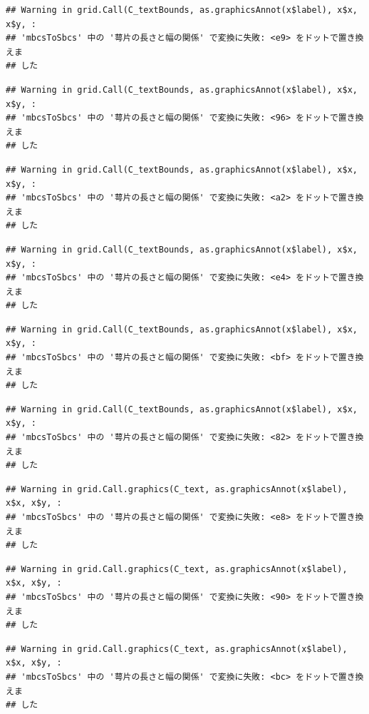 \documentclass[
]{book}
\begin{document}
\begin{verbatim}
## Warning in grid.Call(C_textBounds, as.graphicsAnnot(x$label), x$x, x$y, :
## 'mbcsToSbcs' 中の '萼片の長さと幅の関係' で変換に失敗: <e9> をドットで置き換えま
## した
\end{verbatim}

\begin{verbatim}
## Warning in grid.Call(C_textBounds, as.graphicsAnnot(x$label), x$x, x$y, :
## 'mbcsToSbcs' 中の '萼片の長さと幅の関係' で変換に失敗: <96> をドットで置き換えま
## した
\end{verbatim}

\begin{verbatim}
## Warning in grid.Call(C_textBounds, as.graphicsAnnot(x$label), x$x, x$y, :
## 'mbcsToSbcs' 中の '萼片の長さと幅の関係' で変換に失敗: <a2> をドットで置き換えま
## した
\end{verbatim}

\begin{verbatim}
## Warning in grid.Call(C_textBounds, as.graphicsAnnot(x$label), x$x, x$y, :
## 'mbcsToSbcs' 中の '萼片の長さと幅の関係' で変換に失敗: <e4> をドットで置き換えま
## した
\end{verbatim}

\begin{verbatim}
## Warning in grid.Call(C_textBounds, as.graphicsAnnot(x$label), x$x, x$y, :
## 'mbcsToSbcs' 中の '萼片の長さと幅の関係' で変換に失敗: <bf> をドットで置き換えま
## した
\end{verbatim}

\begin{verbatim}
## Warning in grid.Call(C_textBounds, as.graphicsAnnot(x$label), x$x, x$y, :
## 'mbcsToSbcs' 中の '萼片の長さと幅の関係' で変換に失敗: <82> をドットで置き換えま
## した
\end{verbatim}

\begin{verbatim}
## Warning in grid.Call.graphics(C_text, as.graphicsAnnot(x$label), x$x, x$y, :
## 'mbcsToSbcs' 中の '萼片の長さと幅の関係' で変換に失敗: <e8> をドットで置き換えま
## した
\end{verbatim}

\begin{verbatim}
## Warning in grid.Call.graphics(C_text, as.graphicsAnnot(x$label), x$x, x$y, :
## 'mbcsToSbcs' 中の '萼片の長さと幅の関係' で変換に失敗: <90> をドットで置き換えま
## した
\end{verbatim}

\begin{verbatim}
## Warning in grid.Call.graphics(C_text, as.graphicsAnnot(x$label), x$x, x$y, :
## 'mbcsToSbcs' 中の '萼片の長さと幅の関係' で変換に失敗: <bc> をドットで置き換えま
## した
\end{verbatim}
\end{document}
